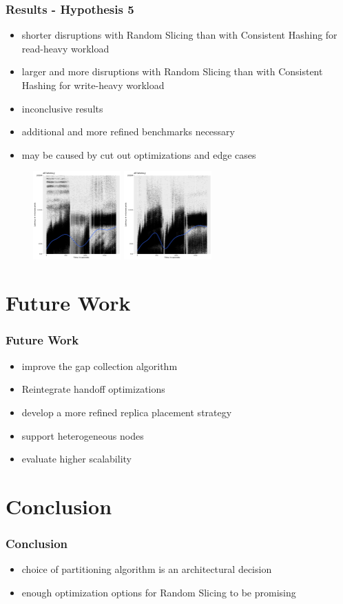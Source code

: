 \documentclass[aspectratio=169]{beamer}
\begin{document}
\begin{frame}
\frametitle{Results - Hypothesis 5}
\begin{itemize}
\item shorter disruptions with Random Slicing than with Consistent Hashing for read-heavy workload
\item larger and more disruptions with Random Slicing than with Consistent Hashing for write-heavy workload
\item inconclusive results
\item additional and more refined benchmarks necessary
\item may be caused by cut out optimizations and edge cases
\end{itemize}
\begin{figure}
\includegraphics[width=0.3\textwidth]{RandomSlicing_Random_dynamic_write_heavy_latency}
\includegraphics[width=0.3\textwidth]{ConsistentHashing_dynamic_write_heavy_latency}
\end{figure}
\end{frame}

\section{Future Work}
\begin{frame}
\frametitle{Future Work}
\begin{itemize}
\item improve the gap collection algorithm
\item Reintegrate handoff optimizations
\item develop a more refined replica placement strategy
\item support heterogeneous nodes
\item evaluate higher scalability
\end{itemize}
\end{frame}

\section{Conclusion}
\begin{frame}
\frametitle{Conclusion}
\begin{itemize}
\item choice of partitioning algorithm is an architectural decision
\item enough optimization options for Random Slicing to be promising
\end{itemize}
\end{frame}
\end{document}
